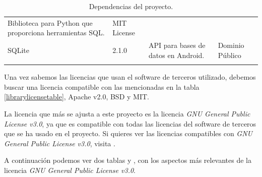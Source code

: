 \begin{longtable}[]{@{}llll@{}}
\begin{minipage}[t]{0.49\columnwidth}
Biblioteca para Python que proporciona herramientas SQL.\strut
\end{minipage} & \begin{minipage}[t]{0.11\columnwidth}\raggedright\strut
MIT License\strut
\end{minipage}\tabularnewline
\begin{minipage}[t]{0.18\columnwidth}\raggedright\strut
SQLite\strut
\end{minipage} & \begin{minipage}[t]{0.08\columnwidth}\raggedright\strut
2.1.0\strut
\end{minipage} & \begin{minipage}[t]{0.49\columnwidth}\raggedright\strut
API para bases de datos en Android.\strut
\end{minipage} & \begin{minipage}[t]{0.11\columnwidth}\raggedright\strut
Dominio Público\strut
\end{minipage}\tabularnewline
\bottomrule
\caption{Dependencias del proyecto.}
\end{longtable}

Una vez sabemos las licencias que usan el software de terceros utilizado, debemos buscar una licencia compatible con las mencionadas en la tabla \ref{librarylicensetable}, Apache v2.0, BSD y MIT.

La licencia que más se ajusta a este proyecto es la licencia \textit{GNU General Public License v3.0}, ya que es compatible con todas las licencias del software de terceros que se ha usado en el proyecto. 
Si quieres ver las licencias compatibles con \textit{GNU General Public License v3.0}, visita \cite{gnulicensecomp}.

A continuación podemos ver dos tablas \cite{gnuresumetable} y \cite{gnuresumetable1}, con los aspectos más relevantes de la licencia \textit{GNU General Public License v3.0}.

